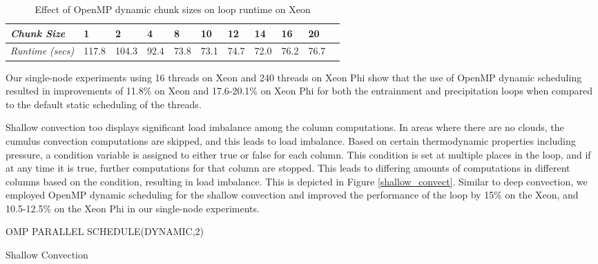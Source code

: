 \begin{table}
\small
\centering
\begin{tabular}{||p{0.58in}|p{0.15in}|p{0.15in}|p{0.15in}|p{0.15in}|p{0.15in}|p{0.15in}|p{0.15in}|p{0.15in}|p{0.15in}|p{0.15in}||}
\hline\hline
{\it Chunk Size} & 1 & 2 & 4 & 8 & 10 & 12 & 14 & 16 & 20 \\
\hline
{\it Runtime (secs)} & 117.8 & 104.3 & 92.4 & 73.8 & 73.1 & 74.7 & 72.0 & 76.2 & 76.7 \\
\hline\hline
\end{tabular}
\caption{Effect of OpenMP dynamic chunk sizes on loop runtime on Xeon}
\label{omp_chunk_xeon}
\end{table}
 


Our single-node experiments using 16 threads on Xeon and 240 threads on Xeon Phi show that the use of OpenMP dynamic scheduling resulted in improvements of 11.8\% on Xeon and 17.6-20.1\% on Xeon Phi for both the entrainment and precipitation loops when compared to the default static scheduling of the threads.

Shallow convection too displays significant load imbalance among the column computations. In areas where there are no clouds, the cumulus convection computations are skipped, and this leads to load imbalance. Based on certain thermodynamic properties including pressure, a condition variable is assigned to either true or false for each column. This condition is set at multiple places in the loop, and if at any time it is true, further computations for that column are stopped. This leads to differing amounts of computations in different columns based on the condition, resulting in load imbalance.
This is depicted in Figure \ref{shallow_convect}.
Similar to deep convection, we employed OpenMP dynamic scheduling for the shallow convection and improved the performance of the loop by 15\% on the Xeon, and 10.5-12.5\% on the Xeon Phi in our single-node experiments.

\begin{algorithm}
\begin{small}

  OMP PARALLEL SCHEDULE(DYNAMIC,2)
\caption{Shallow Convection}
\label{shallow_convect}
\end{small}
\end{algorithm}

